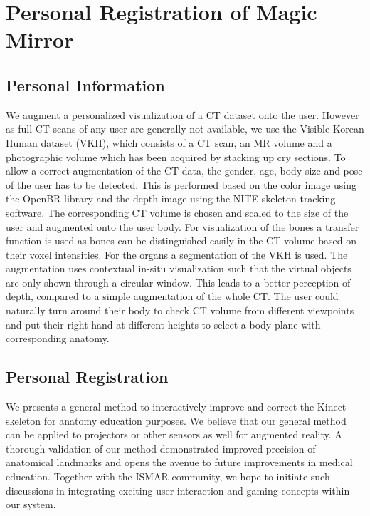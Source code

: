 \section{Personal Registration of Magic Mirror}

\subsection{Personal Information}
We augment a personalized visualization of a CT dataset onto the user. However as full CT scans of any user are generally not available, we use the Visible Korean Human dataset (VKH), which consists of a CT scan, an MR volume and a photographic volume which has been acquired by stacking up cry sections. To allow a correct augmentation of the CT data, the gender, age, body size and pose of the user has to be detected. This is performed based on the color image using the OpenBR library \cite{Klontz2013} and the depth image using the NITE skeleton tracking software. The corresponding CT volume is chosen and scaled to the size of the user and augmented onto the user body. For visualization of the bones a transfer function is used as bones can be distinguished easily in the CT volume based on their voxel intensities. For the organs a segmentation of the VKH is used. The augmentation uses contextual in-situ visualization such that the virtual objects are only shown through a circular window. This leads to a better perception of depth, compared to a simple augmentation of the whole CT. The user could naturally turn around their body to check CT volume from different viewpoints and put their right hand at different heights to select a body plane with corresponding anatomy.

\subsection{Personal Registration}
We presents a general method to interactively improve and correct the Kinect skeleton for anatomy education purposes. We believe that our general method can be applied to projectors or other sensors as well for augmented reality. A thorough validation of our method demonstrated improved precision of anatomical landmarks and opens the avenue to future improvements in medical education. Together with the ISMAR community, we hope to initiate such discussions in integrating exciting user-interaction and gaming concepts within our system.

